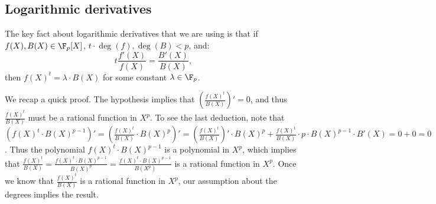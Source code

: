 \subsection*{Logarithmic derivatives}\label{sec:rem}
 The key fact about logarithmic derivatives that we are using is that if 
 $f(X), B(X) \in \F_p[X]$, $t \cdot \deg(f), \deg(B) < p$, and:
 $$ t \frac{f'(X)}{f(X)} = \frac{B'(X)}{B(X)},$$
 then $f(X)^t = \lambda \cdot B(X)$ for some constant $\lambda \in \F_p$. 
 
 We recap a quick proof. The hypothesis implies that $\left( \frac{f(X)^t}{B(X)} \right)' = 0$,
  and thus $\frac{f(X)^t}{B(X)}$ must be a rational function in $X^p$. To see the last deduction, note that $\left(f(X)^t \cdot B(X)^{p-1} \right)' = \left( \frac{f(X)^t}{B(X)} \cdot B(X)^p \right)' = \left( \frac{f(X)^t}{B(X)} \right)' \cdot B(X)^p + \frac{f(X)^t}{B(X)} \cdot p \cdot B(X)^{p-1} \cdot B'(X) = 0 + 0 = 0$. Thus the polynomial $f(X)^t \cdot B(X)^{p-1}$ is a polynomial in $X^p$, which implies that $\frac{f(X)^t}{B(X)} = 
 \frac{f(X)^t \cdot B(X)^{p-1}}{B(X)^p} =
 \frac{f(X)^t \cdot B(X)^{p-1}}{B(X^p)}$ is a rational function in $X^p$. 
 Once we know that $\frac{f(X)^t}{B(X)}$ is a rational function in $X^p$, our assumption about the degrees implies the result. 
